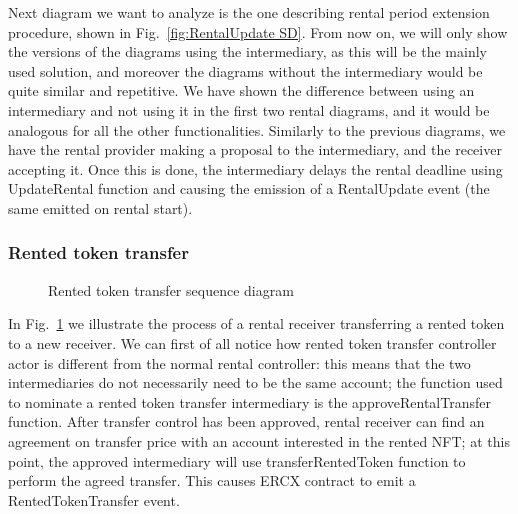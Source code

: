 \documentclass[english, LaM, oneside]{sapthesis}%
\begin{document}
Next diagram we want to analyze is the one describing rental period extension procedure, shown in Fig.~\ref{fig:RentalUpdate SD}. From now on, we will only show the versions of the diagrams using the intermediary, as this will be the mainly used solution, and moreover the diagrams without the intermediary would be quite similar and repetitive. We have shown the difference between using an intermediary and not using it in the first two rental diagrams, and it would be analogous for all the other functionalities.\newline
Similarly to the previous diagrams, we have the rental provider making a proposal to the intermediary, and the receiver accepting it. Once this is done, the intermediary delays the rental deadline using UpdateRental function and causing the emission of a RentalUpdate event (the same emitted on rental start).\newline
\bigskip

\subsubsection{Rented token transfer}

\begin{figure}
    \centering
        \begin{adjustbox}{width=1\textwidth}
        \end{adjustbox}
    \caption{Rented token transfer sequence diagram}
    \label{fig:RentedTokenTransfer SD}
\end{figure}

In Fig.~\ref{fig:RentedTokenTransfer SD} we illustrate the process of a rental receiver transferring a rented token to a new receiver. We can first of all notice how rented token transfer controller actor is different from the normal rental controller: this means that the two intermediaries do not necessarily need to be the same account; the function used to nominate a rented token transfer intermediary is the approveRentalTransfer function. After transfer control has been approved, rental receiver can find an agreement on transfer price with an account interested in the rented NFT; at this point, the approved intermediary will use transferRentedToken function to perform the agreed transfer. This causes ERCX contract to emit a RentedTokenTransfer event.\newline
\bigskip
\end{document}
